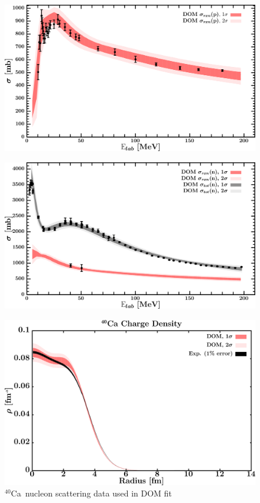\documentclass[twocolumn,secnumarabic,amssymb, nobibnotes, aps, prl,
superscriptaddress, nobalancelastpage]{revtex4}
\newcommand{\caForty}{\ensuremath{^{40}}C\lowercase{a}}
\begin{document}
\begin{figure}[!htb]
\begin{minipage}{0.4\linewidth}
        \label{DOM_ca40_neutron_elastic}
    \end{minipage}
    \centering
    \begin{minipage}{0.4\linewidth}
        \centering
        \includegraphics[width=\linewidth]{figures/ca40_protonInelastic.png}
        \label{DOM_ca40_proton_inelastic}
    \end{minipage}\hspace{6pt}
    \begin{minipage}{0.4\linewidth}
        \centering
        \includegraphics[width=\linewidth]{figures/ca40_neutronInelastic.png}
        \label{DOM_ca40_neutron_inelastic}
    \end{minipage}
    \caption{\caForty\ nucleon scattering data used in DOM fit}
    \label{DOM_ca40_scattering}
    \centering
    \begin{minipage}{0.4\linewidth}
        \centering
        \includegraphics[width=\linewidth]{figures/ca40_chargeDensity.png}

\end{minipage}
\end{figure}
\end{document}
